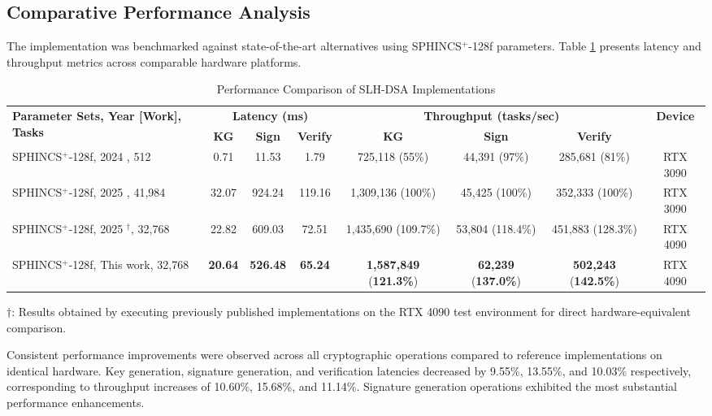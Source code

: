 \documentclass[journal]{IEEEtran}
\begin{document}
\subsection{Comparative Performance Analysis}

The implementation was benchmarked against state-of-the-art alternatives using SPHINCS$^+$-128f parameters. Table \ref{tab:comparative_perf} presents latency and throughput metrics across comparable hardware platforms.

\begin{table}[htpb]
  \centering
  \caption{Performance Comparison of SLH-DSA Implementations}
  \label{tab:comparative_perf}
  \begin{tabular}{@{}lccccccc@{}}
    \toprule
    \multirow{2}{*}{\textbf{Parameter Sets, Year [Work], Tasks}} & \multicolumn{3}{c}{\textbf{Latency (ms)}} & \multicolumn{3}{c}{\textbf{Throughput (tasks/sec)}} & \multirow{2}{*}{\textbf{Device}} \\
    \cmidrule(lr){2-4} \cmidrule(lr){5-7}
    & \textbf{KG} & \textbf{Sign} & \textbf{Verify} & \textbf{KG} & \textbf{Sign} & \textbf{Verify} & \\
    \midrule
    SPHINCS$^+$-128f, 2024 \cite{Kim2024}, 512  & 0.71 & 11.53 & 1.79 & 725,118 (55\%) & 44,391 (97\%) & 285,681 (81\%) & RTX 3090 \\
    SPHINCS$^+$-128f, 2025 \cite{Wang2025}, 41,984 & 32.07 & 924.24 & 119.16 & 1,309,136 (100\%) & 45,425 (100\%) & 352,333 (100\%) & RTX 3090 \\
    SPHINCS$^+$-128f, 2025 \cite{Wang2025}$^\dagger$, 32,768 & 22.82 & 609.03 & 72.51 & 1,435,690 (109.7\%) & 53,804 (118.4\%) & 451,883 (128.3\%) & RTX 4090 \\
    SPHINCS$^+$-128f, This work, 32,768 & \textbf{20.64} & \textbf{526.48} & \textbf{65.24} & \textbf{1,587,849} (\textbf{121.3\%}) & \textbf{62,239} (\textbf{137.0\%}) & \textbf{502,243} (\textbf{142.5\%}) & RTX 4090 \\
    \bottomrule
  \end{tabular}
  \begin{tablenotes}
  \item[] $\dagger$: Results obtained by executing previously published implementations on the RTX 4090 test environment for direct hardware-equivalent comparison.
  \end{tablenotes}
\end{table}

Consistent performance improvements were observed across all cryptographic operations compared to reference implementations on identical hardware. Key generation, signature generation, and verification latencies decreased by 9.55\%, 13.55\%, and 10.03\% respectively, corresponding to throughput increases of 10.60\%, 15.68\%, and 11.14\%. Signature generation operations exhibited the most substantial performance enhancements.
\end{document}
